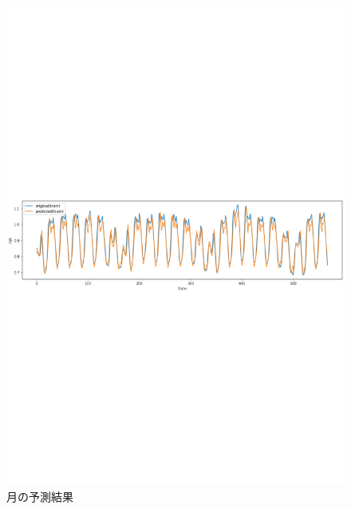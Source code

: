 \begin{figure}[hb]
\begin{center}
\includegraphics[scale=0.8]{rnn_pred_month.pdf}
 \caption{月の予測結果}
\end{center} 
\end{figure}


